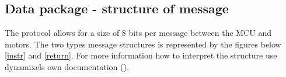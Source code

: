 \subsection{Data package - structure of message}
The protocol allows for a size of 8 bits per message between the MCU and motors. 
The two types message structures is represented by the figures below \ref{instr} and \ref{return}.
For more information how to interpret the structure use dynamixels own documentation ().



